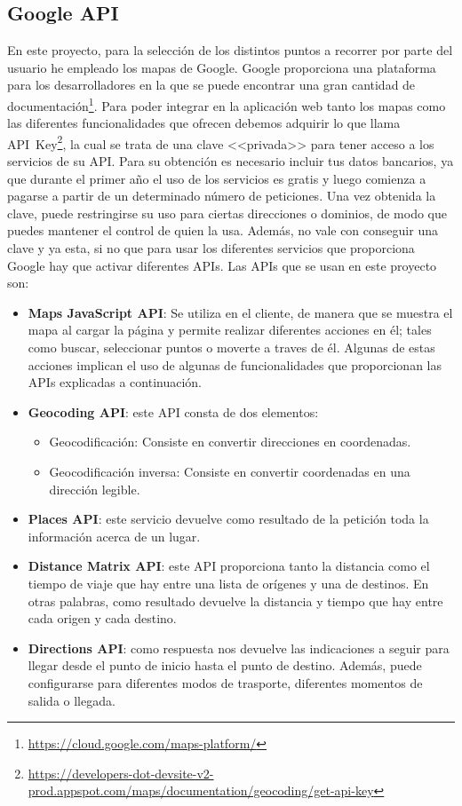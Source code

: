 \subsection{Google API}
En este proyecto, para la selección de los distintos puntos a recorrer por parte del usuario he empleado los mapas de Google. Google proporciona una plataforma para los desarrolladores en la que se puede encontrar una gran cantidad de documentación\footnote{\url{https://cloud.google.com/maps-platform/}}.
Para poder integrar en la aplicación web tanto los mapas como las diferentes funcionalidades que ofrecen debemos adquirir lo que llama API~Key\footnote{\url{https://developers-dot-devsite-v2-prod.appspot.com/maps/documentation/geocoding/get-api-key}}, la cual se trata de una clave <<privada>> para tener acceso a los servicios de su API. Para su obtención es necesario incluir tus datos bancarios, ya que durante el primer año el uso de los servicios es gratis y luego comienza a pagarse a partir de un determinado número de peticiones.
Una vez obtenida la clave, puede restringirse su uso para ciertas direcciones o dominios, de modo que puedes mantener el control de quien la usa. Además, no vale con conseguir una clave y ya esta, si no que para usar los diferentes servicios que proporciona Google hay que activar diferentes APIs.
Las APIs que se usan en este proyecto son:
\begin{itemize}
	\item \textbf{Maps JavaScript API}: Se utiliza en el cliente, de manera que se muestra el mapa al cargar la página y permite realizar diferentes acciones en él; tales como buscar, seleccionar puntos o moverte a traves de él. Algunas de estas acciones implican el uso de algunas de funcionalidades que proporcionan las APIs explicadas a continuación.
	\item \textbf{Geocoding API}: este API consta de dos elementos:
	\begin{itemize}
		\item Geocodificación: Consiste en convertir direcciones en coordenadas.
		\item Geocodificación inversa: Consiste en convertir coordenadas en una dirección legible.
	\end{itemize}
	\item \textbf{Places API}: este servicio devuelve como resultado de la petición toda la información acerca de un lugar.
	\item \textbf{Distance Matrix API}: este API proporciona tanto la distancia como el tiempo de viaje que hay entre una lista de orígenes y una de destinos. En otras palabras, como resultado devuelve la distancia y tiempo que hay entre cada origen y cada destino.
	\item \textbf{Directions API}: como respuesta nos devuelve las indicaciones a seguir para llegar desde el punto de inicio hasta el punto de destino. Además, puede configurarse para diferentes modos de trasporte, diferentes momentos de salida o llegada.
\end{itemize}

